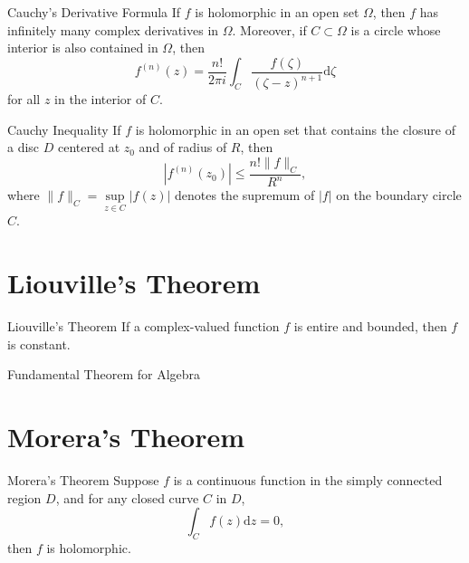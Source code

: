 \begin{corollary}{Cauchy's Derivative Formula}{}
  If $f$ is holomorphic in an open set $\Omega$,
  then $f$ has infinitely many complex derivatives in $\Omega$.
  Moreover, if $C \subset \Omega$ is a circle whose interior is also contained in $\Omega$,
  then
  \begin{equation}
    f^{(n)}(z) = \frac{n!}{2 \pi i} \int_C \frac{f(\zeta)}{(\zeta - z)^{n+1}}\mathrm{d} \zeta
  \end{equation}
  for all $z$ in the interior of $C$.
\end{corollary}

\begin{corollary}{Cauchy Inequality}{}
  If $f$ is holomorphic in an open set that contains the closure of a disc $D$
  centered at $z_0$ and of radius of $R$, then
  \begin{equation}
    |f^{(n)}(z_0)| \leq \frac{n! \|f\|_C}{R^n},
  \end{equation}
  where $\|f\|_C = \sup \limits_{z \in C}|f(z)|$ denotes the supremum of $|f|$
  on the boundary circle $C$.
\end{corollary}

\section{Liouville's Theorem}

\begin{theorem}{Liouville's Theorem}{}
  If a complex-valued function $f$ is entire and bounded, then $f$ is constant.
\end{theorem}

\begin{corollary}{Fundamental Theorem for Algebra}{}
  
\end{corollary}


\section{Morera's Theorem}

\begin{theorem}{Morera's Theorem}{}
  Suppose $f$ is a continuous function in the simply connected region $D$,
  and for any closed curve $C$ in $D$,
  \begin{equation}
    \int_C f(z)\mathrm{d} z = 0,
  \end{equation}
  then $f$ is holomorphic.
\end{theorem}


